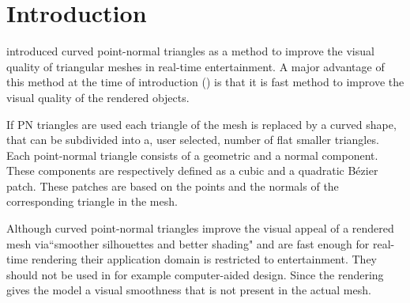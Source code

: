 
\section{Introduction}
\label{s:introduction}

\textcite{vlachos2001curved} introduced curved point-normal triangles as a method to improve the visual quality of triangular meshes in real-time entertainment. A major advantage of this method at the time of introduction (\citeyear{vlachos2001curved}) is that it is fast method to improve the visual quality of the rendered objects.

If PN triangles are used each triangle of the mesh is replaced by a curved shape, that can be subdivided into a, user selected, number of flat smaller triangles. Each point-normal triangle consists of a geometric and a normal component. These components are respectively defined as a cubic and a quadratic Bézier patch. These patches are based on the points and the normals of the corresponding triangle in the mesh. 


Although curved point-normal triangles improve the visual appeal of a rendered mesh via``smoother silhouettes and better shading" \cite{vlachos2001curved} and are fast enough for real-time rendering their application domain is restricted to entertainment. They should not be used in for example computer-aided design. Since the rendering gives the model a visual smoothness that is not present in the actual mesh. 




